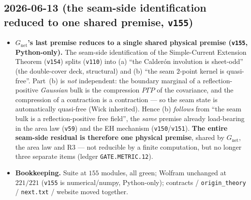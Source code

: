 \documentclass[11pt]{article}
\providecommand{\vref}[1]{\texttt{#1}}
\begin{document}
\subsection*{2026-06-13 (the seam-side identification reduced to one shared premise, \vref{v155})}
\begin{itemize}
\item \textbf{$G_{\mathrm{net}}$'s last premise reduces to a single shared physical premise
  (\vref{v155}, Python-only).} The seam-side identification of the Simple-Current Extension Theorem
  (\vref{v154}) splits (\vref{v110}) into (a) ``the Calder\'on involution is sheet-odd'' (the
  double-cover deck, structural) and (b) ``the seam $2$-point kernel is quasi-free''. Part~(b) is
  \emph{not} independent: the boundary marginal of a reflection-positive \emph{Gaussian} bulk is the
  compression $P\Gamma P$ of the covariance, and the compression of a contraction is a contraction ---
  so the seam state is automatically quasi-free (Wick inherited). Hence (b) \emph{follows} from ``the
  seam bulk is a reflection-positive free field'', the \emph{same} premise already load-bearing in the
  area law (\vref{v59}) and the EH mechanism (\vref{v150}/\vref{v151}). \textbf{The entire seam-side
  residual is therefore one physical premise}, shared by $G_{\mathrm{net}}$, the area law and R3 ---
  not reducible by a finite computation, but no longer three separate items (ledger
  \texttt{GATE.METRIC.12}).
\item \textbf{Bookkeeping.} Suite at $155$ modules, all green; Wolfram unchanged at $221/221$
  (\vref{v155} is numerical/numpy, Python-only); contracts / \texttt{origin\_theory} /
  \texttt{next.txt} / website moved together.
\end{itemize}
\end{document}
